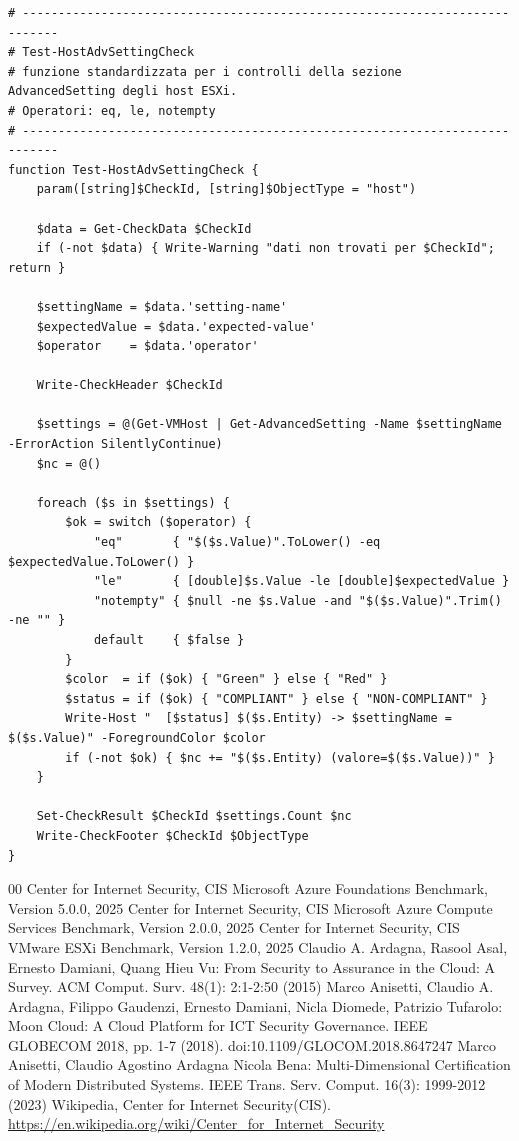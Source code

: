 \documentclass[a4paper,11pt]{report}
\begin{document}
\begin{lstlisting}[style=azcli, caption={Funzione \texttt{Test-HostAdvSettingCheck} per le verifiche sulle impostazioni degli host ESXi}, label={lst:test-host-adv-setting}]
# ---------------------------------------------------------------------------
# Test-HostAdvSettingCheck
# funzione standardizzata per i controlli della sezione AdvancedSetting degli host ESXi.
# Operatori: eq, le, notempty
# ---------------------------------------------------------------------------
function Test-HostAdvSettingCheck {
    param([string]$CheckId, [string]$ObjectType = "host")

    $data = Get-CheckData $CheckId
    if (-not $data) { Write-Warning "dati non trovati per $CheckId"; return }

    $settingName = $data.'setting-name'
    $expectedValue = $data.'expected-value'
    $operator    = $data.'operator'

    Write-CheckHeader $CheckId 

    $settings = @(Get-VMHost | Get-AdvancedSetting -Name $settingName -ErrorAction SilentlyContinue)
    $nc = @()

    foreach ($s in $settings) {
        $ok = switch ($operator) {
            "eq"       { "$($s.Value)".ToLower() -eq $expectedValue.ToLower() }
            "le"       { [double]$s.Value -le [double]$expectedValue }
            "notempty" { $null -ne $s.Value -and "$($s.Value)".Trim() -ne "" }
            default    { $false }
        }
        $color  = if ($ok) { "Green" } else { "Red" }
        $status = if ($ok) { "COMPLIANT" } else { "NON-COMPLIANT" }
        Write-Host "  [$status] $($s.Entity) -> $settingName = $($s.Value)" -ForegroundColor $color
        if (-not $ok) { $nc += "$($s.Entity) (valore=$($s.Value))" }
    }

    Set-CheckResult $CheckId $settings.Count $nc
    Write-CheckFooter $CheckId $ObjectType
}
\end{lstlisting}


%
%
\begin{thebibliography}{00}
%
Center for Internet Security, CIS Microsoft Azure Foundations Benchmark, Version 5.0.0, 2025
%
Center for Internet Security, CIS Microsoft Azure Compute Services Benchmark, Version 2.0.0, 2025
%
Center for Internet Security, CIS VMware ESXi Benchmark, Version 1.2.0, 2025
%
Claudio A. Ardagna, Rasool Asal, Ernesto Damiani, Quang Hieu Vu: From Security to Assurance in the Cloud: A Survey.
ACM Comput. Surv. 48(1): 2:1-2:50 (2015)
%
Marco Anisetti, Claudio A. Ardagna, Filippo Gaudenzi, Ernesto Damiani, Nicla Diomede, Patrizio Tufarolo: Moon Cloud: A Cloud Platform for ICT Security Governance.
IEEE GLOBECOM 2018, pp. 1-7 (2018). doi:10.1109/GLOCOM.2018.8647247
%
Marco Anisetti, Claudio Agostino Ardagna Nicola Bena: Multi-Dimensional Certification of Modern Distributed Systems.
IEEE Trans. Serv. Comput. 16(3): 1999-2012 (2023)
%
Wikipedia, Center for Internet Security(CIS). \url{https://en.wikipedia.org/wiki/Center_for_Internet_Security}
%
\end{thebibliography}
% 
\end{document}
